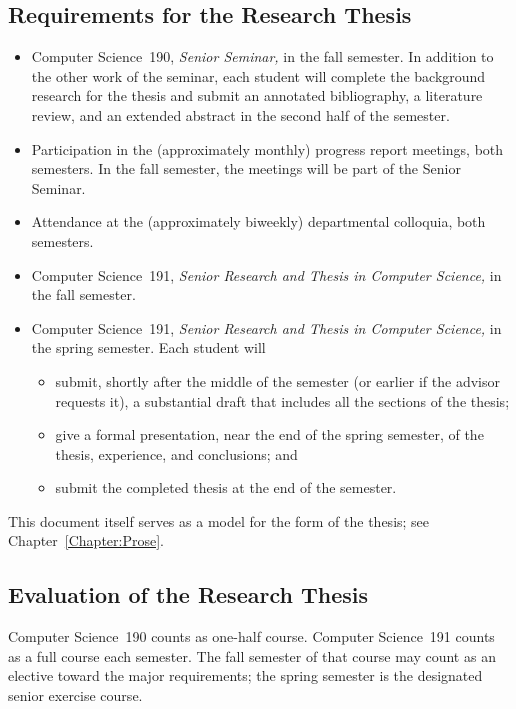 \documentclass[finalcopy]{srpaper}
\def\hyperref[#1]{}
\let\plainref\ref
\newcommand{\plainref}{\ref*}
\newcommand{\namedref}[2]{\hyperref[#2]{#1~\plainref{#2}}}
\begin{document}
\subsection*{Requirements for the Research Thesis}
\begin{itemize}
\item
Computer Science~190, \textit{Senior Seminar,} in the fall
semester. In addition to the other work of the seminar,
each student will complete the background research for the
thesis and submit an annotated bibliography, a
literature review, and an extended abstract in the second
half of the semester.
\item 
Participation in the (approximately monthly) progress report
meetings, both semesters. In the fall semester, the meetings
will be part of the Senior Seminar.
\item
Attendance at the (approximately biweekly) departmental
colloquia, both semesters.
\item 
Computer Science~191, \textit{Senior Research and Thesis in
Computer Science,} in the fall semester.
\item
Computer Science~191, \textit{Senior Research and Thesis in
Computer Science,} in the spring semester. Each student will
\begin{itemize}
\item
submit, shortly after the middle of the semester (or earlier
if the advisor requests it), a substantial draft that
includes all the sections of the thesis;
\item
give a formal presentation, near the end of the spring
semester, of the thesis, experience, and conclusions; and
\item
submit the completed thesis at the end of the semester.
\end{itemize}
\end{itemize}
This document itself serves as a model for the form of the
thesis; see \namedref{Chapter}{Chapter:Prose}.

\subsection*{Evaluation of the Research Thesis}
Computer Science~190 counts as one-half course. Computer
Science~191 counts as a full course each semester. The fall
semester of that course may count as an elective toward the
major requirements; the spring semester is the designated
senior exercise course.
\end{document}
